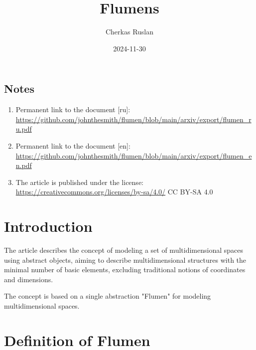\documentclass[final]{article}
\begin{document}
    \title{Flumens}
    \author{Cherkas Ruslan}
    \date{2024-11-30}

    \begin{small}
        \begingroup
        \renewcommand{\baselinestretch}{0.8}

        \renewcommand{\contentsname}{Contents}
        \maketitle
        \tableofcontents
        
        \section*{Notes}
            \begin{enumerate}
                \item Permanent link to the document [ru]:
                \url{https://github.com/johnthesmith/flumen/blob/main/arxiv/export/flumen_ru.pdf}
            
                \item Permanent link to the document [en]:
                \url{https://github.com/johnthesmith/flumen/blob/main/arxiv/export/flumen_en.pdf}
            
                \item The article is published under the license:
                \url{https://creativecommons.org/licenses/by-sa/4.0/} CC BY-SA 4.0
            \end{enumerate}
        \endgroup
    \end{small}

    \section{Introduction}

        The article describes the concept of modeling a set of multidimensional 
        spaces using abstract objects, aiming to describe multidimensional 
        structures with the minimal number of basic elements, excluding 
        traditional notions of coordinates and dimensions.

        The concept is based on a single abstraction "Flumen" for modeling 
        multidimensional spaces.

    \section{Definition of Flumen}
\end{document}

